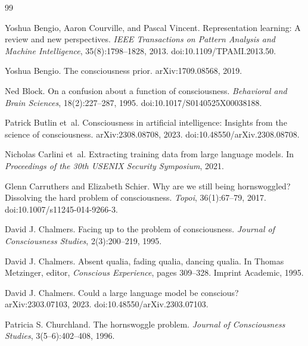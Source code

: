 \documentclass[11pt,a4paper]{article}
\theoremstyle{remark}\newtheorem{remark}[definition]{Remark}
\begin{document}
\sloppy
\begin{thebibliography}{99}

Yoshua Bengio, Aaron Courville, and Pascal Vincent.
\newblock Representation learning: A review and new perspectives.
\newblock \emph{IEEE Transactions on Pattern Analysis and Machine Intelligence},
35(8):1798--1828, 2013.
\newblock doi:10.1109/TPAMI.2013.50.

Yoshua Bengio.
\newblock The consciousness prior.
\newblock arXiv:1709.08568, 2019.

Ned Block.
\newblock On a confusion about a function of consciousness.
\newblock \emph{Behavioral and Brain Sciences}, 18(2):227--287, 1995.
\newblock doi:10.1017/S0140525X00038188.

Patrick Butlin et~al.
\newblock Consciousness in artificial intelligence: Insights from the science of consciousness.
\newblock arXiv:2308.08708, 2023.
\newblock doi:10.48550/arXiv.2308.08708.

Nicholas Carlini et~al.
\newblock Extracting training data from large language models.
\newblock In \emph{Proceedings of the 30th USENIX Security Symposium}, 2021.

Glenn Carruthers and Elizabeth Schier.
\newblock Why are we still being hornswoggled? Dissolving the hard problem of consciousness.
\newblock \emph{Topoi}, 36(1):67--79, 2017.
\newblock doi:10.1007/s11245-014-9266-3.

David J. Chalmers.
\newblock Facing up to the problem of consciousness.
\newblock \emph{Journal of Consciousness Studies}, 2(3):200--219, 1995.

David J. Chalmers.
\newblock Absent qualia, fading qualia, dancing qualia.
\newblock In Thomas Metzinger, editor, \emph{Conscious Experience}, pages 309--328.
Imprint Academic, 1995.

David J. Chalmers.
\newblock Could a large language model be conscious?
\newblock arXiv:2303.07103, 2023.
\newblock doi:10.48550/arXiv.2303.07103.

Patricia S. Churchland.
\newblock The hornswoggle problem.
\newblock \emph{Journal of Consciousness Studies}, 3(5--6):402--408, 1996.


\end{thebibliography}
\end{document}
